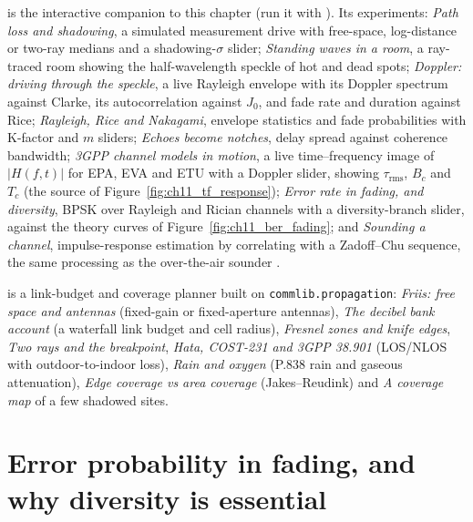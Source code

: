 \begin{labbox}
 is the interactive companion to this chapter
(run it with ). Its experiments: \emph{Path loss and shadowing}, a
simulated measurement drive with free-space, log-distance or two-ray medians and a shadowing-$\sigma$
slider; \emph{Standing waves in a room}, a ray-traced room showing the half-wavelength speckle of hot
and dead spots; \emph{Doppler: driving through the speckle}, a live Rayleigh envelope with its Doppler
spectrum against Clarke, its autocorrelation against $J_0$, and fade rate and duration against Rice;
\emph{Rayleigh, Rice and Nakagami}, envelope statistics and fade probabilities with K-factor and $m$
sliders; \emph{Echoes become notches}, delay spread against coherence bandwidth; \emph{3GPP channel
models in motion}, a live time--frequency image of $|H(f,t)|$ for EPA, EVA and ETU with a Doppler
slider, showing $\tau_{\text{rms}}$, $B_c$ and $T_c$ (the source of Figure~\ref{fig:ch11_tf_response});
\emph{Error rate in fading, and diversity}, BPSK over Rayleigh and Rician channels with a
diversity-branch slider, against the theory curves of Figure~\ref{fig:ch11_ber_fading}; and
\emph{Sounding a channel}, impulse-response estimation by correlating with a Zadoff--Chu sequence, the
same processing as the over-the-air sounder .

 is a link-budget and coverage planner
built on \texttt{commlib.propagation}: \emph{Friis: free space and antennas} (fixed-gain or
fixed-aperture antennas), \emph{The decibel bank account} (a waterfall link budget and cell radius),
\emph{Fresnel zones and knife edges}, \emph{Two rays and the breakpoint}, \emph{Hata, COST-231 and
3GPP 38.901} (LOS/NLOS with outdoor-to-indoor loss), \emph{Rain and oxygen} (P.838 rain and gaseous
attenuation), \emph{Edge coverage vs area coverage} (Jakes--Reudink) and \emph{A coverage map} of a
few shadowed sites.
\end{labbox}

\section{Error probability in fading, and why diversity is essential}
\label{sec:ch11:ber}

